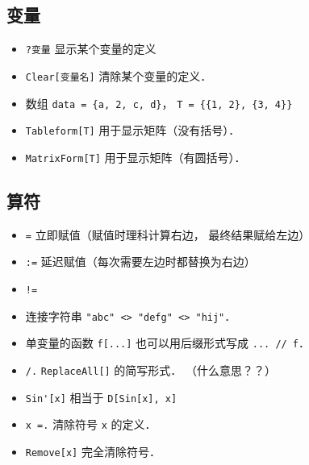 \subsection{变量}
\begin{itemize}
\item \verb|?变量| 显示某个变量的定义
\item \verb|Clear[变量名]| 清除某个变量的定义．
\item 数组 \verb|data = {a, 2, c, d}|， \verb|T = {{1, 2}, {3, 4}}|
\item \verb|Tableform[T]| 用于显示矩阵（没有括号）．
\item \verb|MatrixForm[T]| 用于显示矩阵（有圆括号）．
\end{itemize}

\subsection{算符}
\begin{itemize}
\item \verb|=| 立即赋值（赋值时理科计算右边， 最终结果赋给左边）
\item \verb|:=| 延迟赋值（每次需要左边时都替换为右边）
\item \verb|!=|
\item 连接字符串 \verb|"abc" <> "defg" <> "hij"|．
\item 单变量的函数 \verb|f[...]| 也可以用后缀形式写成 \verb|... // f|．
\item \verb|/.| \verb|ReplaceAll[]| 的简写形式． （什么意思？？）
\item \verb|Sin'[x]| 相当于 \verb|D[Sin[x], x]|
\item \verb|x =.| 清除符号 \verb|x| 的定义．
\item \verb|Remove[x]| 完全清除符号．
\end{itemize}

